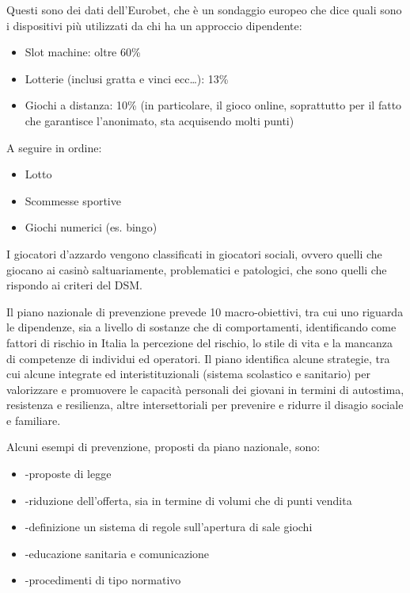 Questi sono dei dati dell'Eurobet, che è un sondaggio europeo che dice
quali sono i dispositivi più utilizzati da chi ha un approccio
dipendente:

\begin{itemize}
\item
  Slot machine: oltre 60\%
\item
  Lotterie (inclusi gratta e vinci ecc\ldots{}): 13\%
\item
  Giochi a distanza: 10\% (in particolare, il gioco online, soprattutto
  per il fatto che garantisce l'anonimato, sta acquisendo molti punti)
\end{itemize}

A seguire in ordine:

\begin{itemize}
\item
  Lotto
\item
  Scommesse sportive
\item
  Giochi numerici (es. bingo)
\end{itemize}

I giocatori d'azzardo vengono classificati in giocatori sociali, ovvero
quelli che giocano ai casinò saltuariamente, problematici e patologici,
che sono quelli che rispondo ai criteri del DSM.

Il piano nazionale di prevenzione prevede 10 macro-obiettivi, tra cui
uno riguarda le dipendenze, sia a livello di sostanze che di
comportamenti, identificando come fattori di rischio in Italia la
percezione del rischio, lo stile di vita e la mancanza di competenze di
individui ed operatori. Il piano identifica alcune strategie, tra cui
alcune integrate ed interistituzionali (sistema scolastico e sanitario)
per valorizzare e promuovere le capacità personali dei giovani in
termini di autostima, resistenza e resilienza, altre intersettoriali per
prevenire e ridurre il disagio sociale e familiare.

Alcuni esempi di prevenzione, proposti da piano nazionale, sono:
\begin{itemize}


\item 
-proposte di legge
\item 
-riduzione dell'offerta, sia in termine di volumi che di punti vendita
\item 
-definizione un sistema di regole sull'apertura di sale giochi
\item 
-educazione sanitaria e comunicazione
\item 
-procedimenti di tipo normativo
\end{itemize}

